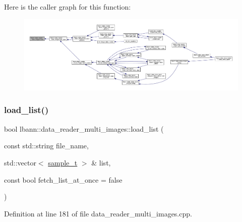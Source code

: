 Here is the caller graph for this function\+:\nopagebreak
\begin{figure}[H]
\begin{center}
\leavevmode
\includegraphics[width=350pt]{classlbann_1_1data__reader__multi__images_afb8adef1f9ac6723d71ae5afc29b01ec_icgraph}
\end{center}
\end{figure}
\mbox{\label{classlbann_1_1data__reader__multi__images_a31763c860d3e3cc57a6af0158b9977f7}} 
\subsubsection{\texorpdfstring{load\+\_\+list()}{load\_list()}}
{\footnotesize\ttfamily bool lbann\+::data\+\_\+reader\+\_\+multi\+\_\+images\+::load\+\_\+list (\begin{DoxyParamCaption}\item[{const std\+::string}]{file\+\_\+name,  }\item[{std\+::vector$<$ \hyperlink{classlbann_1_1data__reader__multi__images_a6cbb30001dd633b0d810c417cbbf441e}{sample\+\_\+t} $>$ \&}]{list,  }\item[{const bool}]{fetch\+\_\+list\+\_\+at\+\_\+once = {\ttfamily false} }\end{DoxyParamCaption})\hspace{0.3cm}{\ttfamily [protected]}}



Definition at line 181 of file data\+\_\+reader\+\_\+multi\+\_\+images.\+cpp.


